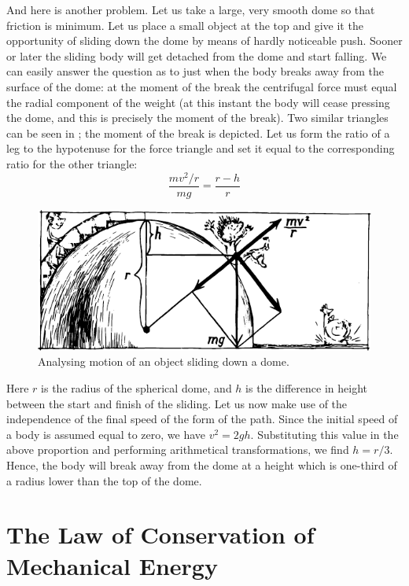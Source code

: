 And here is another problem. Let us take a large, very
smooth dome so that friction is minimum. Let us place
a small object at the top and give it the opportunity
of sliding down the dome by means of hardly noticeable
push. Sooner or later the sliding body will get detached
from the dome and start falling. We can easily answer the
question as to just when the body breaks away from the
surface of the dome: at the moment of the break the
centrifugal force must equal the radial component of
the weight (at this instant the body will cease pressing
the dome, and this is precisely the moment of the break).
Two similar triangles can be seen in ; the
moment of the break is depicted. Let us form the ratio
of a leg to the hypotenuse for the force triangle and set
it equal to the corresponding ratio for the other triangle:
\begin{equation*}%
\frac{mv^{2}/r}{mg} = \frac{r-h}{r}
\end{equation*}
\begin{figure}[!ht]
\centering
\includegraphics[width=\textwidth]{figures/fig-03-05.pdf}
\caption{Analysing motion of an object sliding down a dome.}
\label{fig-3.05}
\end{figure}

Here $r$ is the radius of the spherical dome, and $h$ is the
difference in height between the start and finish of the
sliding. Let us now make use of the independence of the
final speed of the form of the path. Since the initial
speed of a body is assumed equal to zero, we have $v^{2} =
 2gh$. Substituting this value in the above proportion
and performing arithmetical transformations, we find
$h = r/3$. Hence, the body will break away from the dome
at a height which is one-third of a radius lower than the
top of the dome.

\section{The Law of Conservation of Mechanical Energy}

